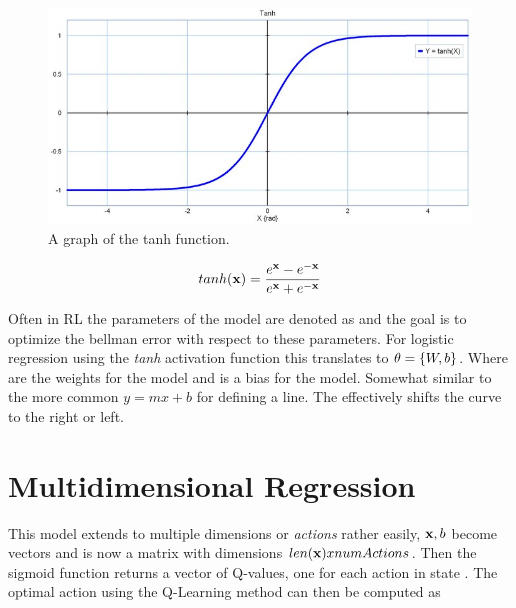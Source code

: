 \begin{figure}
	\centering
	\label{figure:tanh-function}
	\includegraphics[width=0.95\linewidth]{../images/tanh_zoom60.jpg}
	\caption{A graph of the tanh function.}
\end{figure}

\begin{equation}
	tanh(\textbf{x})=\frac
	{e^{\textbf{x}}-e^{-\textbf{x}}}
	{e^{\textbf{x}}+e^{-\textbf{x}}}
\end{equation}


Often in RL the parameters of the model are denoted as \modelParameters and the goal is to optimize the bellman error with respect to these parameters. For logistic regression using the \textit{tanh} activation function this translates to $\theta=\{W,b\}$. Where \weightMatrix are the weights for the model and \basisVector is a bias for the model. Somewhat similar to the more common $y=mx+b$ for defining a line. The \basisVector effectively shifts the curve to the right or left.

\section{Multidimensional Regression}

This model extends to multiple dimensions or \textit{actions} rather easily, $\textbf{x}, b$ become vectors and \weightMatrix is now a matrix with dimensions $len(\textbf{x}) x numActions$. Then the sigmoid function returns a vector of Q-values, one for each action in state . The optimal action using the Q-Learning method can then be computed as

